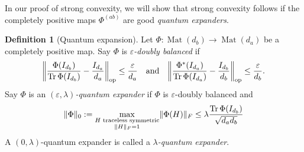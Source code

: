 \documentclass[aos]{imsart}
\theoremstyle{definition}
\newtheorem*{definition}{Definition}
\numberwithin{equation}{section}
\DeclareMathOperator{\op}{op}
\DeclareMathOperator{\mat}{Mat}
\DeclareMathOperator{\tr}{Tr}
\DeclareMathOperator{\vect}{vec}
\DeclarePairedDelimiter{\norm}{\lVert}{\rVert}
\newcommand{\ot}{\otimes}
\newcommand{\eps}{\varepsilon}
\begin{document}
%
In our proof of strong convexity, we will show that strong convexity follows if the completely positive maps $\Phi^{(ab)}$ are good \emph{quantum expanders}.

\begin{definition}[Quantum expansion]
Let $\Phi\colon\mat(d_b) \to \mat(d_a)$ be a completely positive map.
Say $\Phi$ is \emph{$\eps$-doubly balanced} if
\begin{align}\label{eq:doubly balanced}
  \norm*{\frac{\Phi(I_{d_b})}{\tr \Phi(I_{d_b})} - \frac{I_{d_a}}{d_a}}_{\op} \leq \frac\eps{d_a}
\quad\text{and}\quad
  \norm*{\frac{\Phi^*(I_{d_a})}{\tr \Phi(I_{d_a})} - \frac{I_{d_b}}{d_b}}_{\op} \leq \frac\eps{d_b}.
\end{align}
Say $\Phi$ is an \emph{$(\eps, \lambda)$-quantum expander} if $\Phi$ is $\eps$-doubly balanced and
\begin{align}\label{eq:expansion}
  \norm{\Phi}_0 := \max_{\substack{H \text{ traceless symmetric} \\ \norm H_F=1}} \norm{\Phi(H)}_F
\leq \lambda \frac{\tr \Phi(I_{d_b})}{\sqrt{d_ad_b}}
\end{align}
A $(0, \lambda)$-quantum expander is called a \emph{$\lambda$-quantum expander}.
\end{definition}
\end{document}
